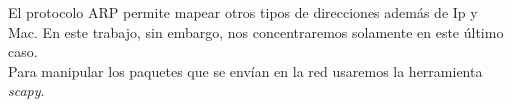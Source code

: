 El protocolo ARP permite mapear otros tipos de direcciones adem\'as de Ip y Mac. En este trabajo, sin embargo, nos concentraremos solamente en este \'ultimo caso. \\

Para manipular los paquetes que se env\'ian en la red usaremos la herramienta \emph{scapy}. 

